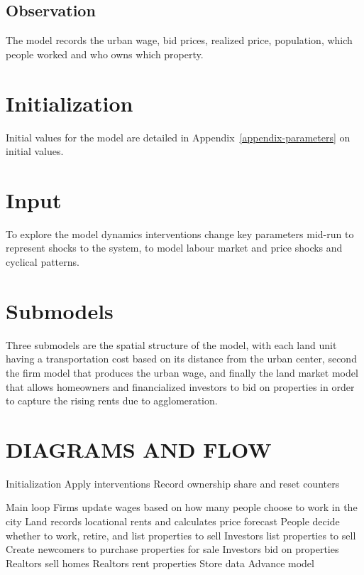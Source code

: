 \subsection{Observation}
The model records the urban wage, bid prices, realized price, population, which people worked and who owns which property.

\section{Initialization}
Initial values for the model are detailed in Appendix~\ref{appendix-parameters} on initial values.

\section{Input}
To explore the model dynamics interventions change key parameters mid-run to represent shocks to the system, to model labour market and price shocks and cyclical patterns. %

\section{Submodels}
Three submodels are the spatial structure of the model, with each land unit having a transportation cost based on its distance from the urban center, second the firm model that produces the urban wage, and finally the land market model that allows homeowners and financialized investors to bid on properties in order to capture the rising rents due to agglomeration.  


\section{DIAGRAMS AND FLOW}

Initialization
Apply interventions
Record ownership share and reset counters

Main loop
Firms update wages based on how many people choose to work in the city
Land records locational rents and calculates price forecast
People decide whether to work, retire, and list properties to sell
Investors list properties to sell
Create newcomers to purchase properties for sale
Investors bid on properties
Realtors sell homes
Realtors rent properties
Store data
Advance model

